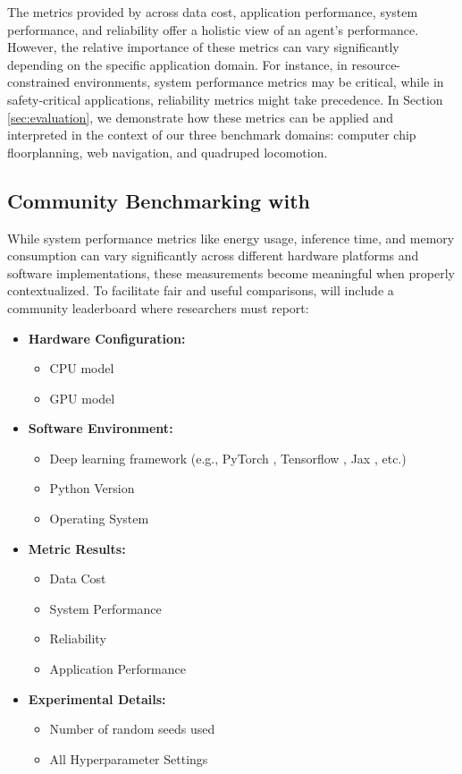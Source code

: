 The metrics provided by \method across data cost, application performance, system performance, and reliability offer a holistic view of an agent's performance.
However, the relative importance of these metrics can vary significantly depending on the specific application domain.
For instance, in resource-constrained environments, system performance metrics may be critical, while in safety-critical applications, reliability metrics might take precedence.
In Section \ref{sec:evaluation}, we demonstrate how these metrics can be applied and interpreted in the context of our three benchmark domains: computer chip floorplanning, web navigation, and quadruped locomotion.
\subsection{Community Benchmarking with \method}
\label{ssec:community_benchmarking}
While system performance metrics like energy usage, inference time, and memory consumption can vary significantly across different hardware platforms and software implementations, these measurements become meaningful when properly contextualized. To facilitate fair and useful comparisons, \method will include a community leaderboard where researchers must report:

\begin{itemize}
\item \textbf{Hardware Configuration:}
\begin{itemize}
\item CPU model
\item GPU model
\end{itemize}

\item \textbf{Software Environment:}
\begin{itemize}
\item Deep learning framework (e.g., PyTorch \citep{paszke2019pytorch}, Tensorflow \citep{abadi2016tensorflow}, Jax \citep{jax2018github}, etc.)
\item Python Version
\item Operating System
\end{itemize}

\item \textbf{Metric Results:}
\begin{itemize}
\item Data Cost
\item System Performance
\item Reliability
\item Application Performance
\end{itemize}

\item \textbf{Experimental Details:}
\begin{itemize}
\item Number of random seeds used
\item All Hyperparameter Settings
\end{itemize}

\end{itemize}


